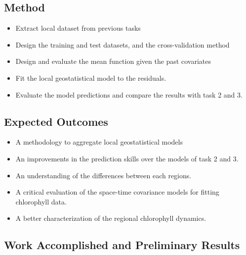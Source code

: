 \subsection{Method}

\begin{itemize}
\item Extract local dataset from previous tasks
\item Design the training and test datasets, and the cross-validation method
\item Design and evaluate the mean function given the past covariates
\item Fit the local geostatistical model to the residuals.
\item Evaluate the model predictions and compare the results with task 2 and 3.
\end{itemize}

\subsection{Expected Outcomes}

\begin{itemize}
\item A methodology to aggregate local geostatistical models
\item An improvements in the prediction skills over the models of task 2 and 3.
\item An understanding of the differences between each regions.
\item A critical evaluation of the space-time covariance models for fitting chlorophyll data.
\item A better characterization of the regional chlorophyll dynamics.
\end{itemize}

\subsection{Work Accomplished and Preliminary Results}

